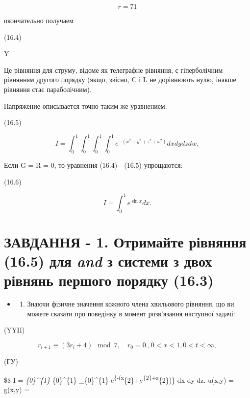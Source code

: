 \documentclass[
  ukrainian,
]{article}
\providecommand{\tightlist}{%
  \setlength{\itemsep}{0pt}\setlength{\parskip}{0pt}}
\begin{document}
\[
r = 71
\]

окончательно получаем

(16.4)

Y

Це рівняння для струму, відоме як телеграфне рівняння, є гіперболічним
рівнянням другого порядку (якщо, звісно, C і L не дорівнюють нулю,
інакше рівняння стає параболічним).

Напряжение описывается точно таким же уравнением:

(16.5)

\[
I = \int_{0}^{1} \int_{0}^{1} \int_{0}^{1} \int_{0}^{1} e^{-(x^{2}+y^{2}+z^{2}+\omega^{2})} dx dy dz dw,
\]

Если G = R = 0, то уравнения (16.4)---(16.5) упрощаются:

(16.6)

\[
I = \int_{0}^{1} e^{\sin x} dx.
\]

\section{\texorpdfstring{ЗАВДАННЯ - 1. Отримайте рівняння (16.5) для
\emph{and} з системи з двох рівнянь першого порядку
(16.3)}{ЗАВДАННЯ - 1. Отримайте рівняння (16.5) для and з системи з двох рівнянь першого порядку (16.3)}}\label{ux437ux430ux432ux434ux430ux43dux43dux44f---1.-ux43eux442ux440ux438ux43cux430ux439ux442ux435-ux440ux456ux432ux43dux44fux43dux43dux44f-16.5-ux434ux43bux44f-and-ux437-ux441ux438ux441ux442ux435ux43cux438-ux437-ux434ux432ux43eux445-ux440ux456ux432ux43dux44fux43dux44c-ux43fux435ux440ux448ux43eux433ux43e-ux43fux43eux440ux44fux434ux43aux443-16.3}

\begin{itemize}
\tightlist
\item
  \begin{enumerate}
  \def\labelenumi{\arabic{enumi}.}
  \setcounter{enumi}{1}
  \tightlist
  \item
    Знаючи фізичне значення кожного члена хвильового рівняння, що ви
    можете сказати про поведінку в момент розв'язання наступної задачі:
  \end{enumerate}
\end{itemize}

(YYII)

\[
r_{i+1} \equiv (3r_i + 4) \mod 7, \quad r_0 = 0.
,  0 < x < 1  ,  0 < t < \infty  ,
\]

(ГУ)

\$\$ I = \int\emph{\{0\}\^{}\{1\} \int}\{0\}\^{}\{1\}
\int\_\{0\}\^{}\{1\}
e\textsuperscript{\{-(x}\{2\}+y\textsuperscript{\{2\}+z}\{2\})\} dx dy
dz. u(x,y) = g(x,y) =
\end{document}

